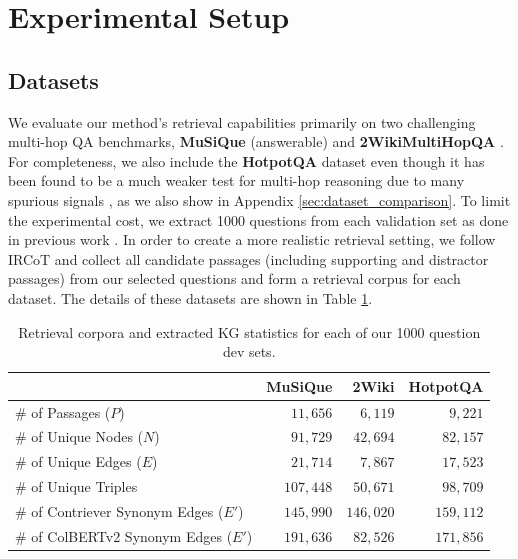 \documentclass{article}
\begin{document}
\section{Experimental Setup}
\label{sec:experimental_setup}

\subsection{Datasets}
\label{subsec:datasets}

We evaluate our method's retrieval capabilities primarily on two challenging multi-hop QA benchmarks, \textbf{MuSiQue} (answerable) \cite{musique} and \textbf{2WikiMultiHopQA} \cite{2wiki}. For completeness, we also include the \textbf{HotpotQA} \cite{hotpotqa} dataset even though it has been found to be a much weaker test for multi-hop reasoning due to many spurious signals \cite{musique}, as we also show in Appendix \ref{sec:dataset_comparison}.
To limit the experimental cost, we extract \num{1000} questions from each validation set as done in previous work \cite{17Press2022MeasuringAN,ircot}. 
In order to create a more realistic retrieval setting, we follow IRCoT \cite{ircot} and collect all candidate passages (including supporting and distractor passages) from our selected questions and form a retrieval corpus for each dataset. The details of these datasets are shown in Table \ref{tab:dataset statistics}. 

\begin{table}[h]
\centering
\small
\caption{Retrieval corpora and extracted KG statistics for each of our \num{1000} question dev sets.}
\label{tab:dataset statistics}
\begin{tabular}{lrrr}
\toprule
 & \textbf{MuSiQue} & \textbf{2Wiki} & \textbf{HotpotQA} \\ \midrule%
\# of Passages ($P$) & $11,656$ & $6,119$ & $9,221$ \\%
\# of Unique Nodes ($N$) & $91,729$ & $42,694$ & $82,157$\\%
\# of Unique Edges ($E$) & $21,714$  & $7,867$ & $17,523$ \\%
\# of Unique Triples & $107,448$ & $50,671$ & $98,709$ \\
\# of Contriever Synonym Edges ($E'$) & $145,990$  & $146,020$ & $159,112$ \\
\# of ColBERTv2 Synonym Edges ($E'$) & $191,636$  & $82,526$ & $171,856$ \\
\bottomrule
\end{tabular}
\vspace{-10pt}
\end{table}
\end{document}
